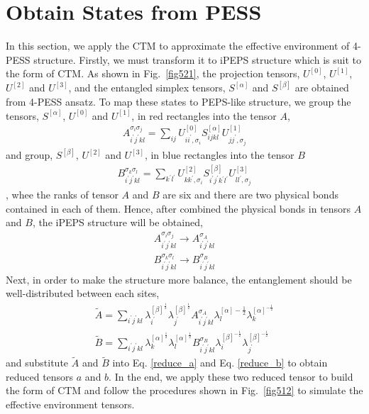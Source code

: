 \section{Obtain States from PESS}
\label{pessctm}
In this section, we apply the CTM to approximate the effective environment of 4-PESS structure. Firstly, we must transform it to iPEPS structure which is suit to the form of CTM. As shown in Fig.~\ref{fig521}, the projection tensors, $U^{[0]}$, $U^{[1]}$, $U^{[2]}$ and $U^{[3]}$, and the entangled simplex tensors, $S^{[\alpha]}$ and $S^{[\beta]}$ are obtained from 4-PESS ansatz. To map these states to PEPS-like structure, we group the tensors, $S^{[\alpha]}$, $U^{[0]}$ and $U^{[1]}$, in red rectangles into the tensor $A$, 
\begin{align}
	A^{\sigma_i \sigma_j}_{i^{\prime}j^{\prime}kl} = \sum_{ij}{U^{[0]}_{ ii^{\prime},\sigma_i} S^{[\alpha]}_{ijkl} U^{[1]}_{ jj^{\prime},\sigma_j}}
\end{align}
and group, $S^{[\beta]}$, $U^{[2]}$ and $U^{[3]}$, in blue rectangles into the tensor $B$
\begin{align}
	B^{\sigma_k \sigma_l}_{i^{\prime}j^{\prime}kl} = \sum_{k^{\prime}l^{\prime}}{U^{[2]}_{ kk^{\prime},\sigma_i} S^{[\beta]}_{i^{\prime}j^{\prime}k^{\prime}l^{\prime}} U^{[3]}_{ ll^{\prime},\sigma_j}}
\end{align}
, whee the ranks of tensor $A$ and $B$ are six and there are two physical bonds contained in each of them. Hence, after combined the physical bonds in tensors $A$ and $B$, the iPEPS structure will be obtained,
\begin{align}
	A^{\sigma_i \sigma_j}_{i^{\prime}j^{\prime}kl} \rightarrow  A^{\sigma_A}_{i^{\prime}j^{\prime}kl} \\
	B^{\sigma_k \sigma_l}_{i^{\prime}j^{\prime}kl} \rightarrow  B^{\sigma_B}_{i^{\prime}j^{\prime}kl}
\end{align}
Next, in order to make the structure more balance, the entanglement should be well-distributed between each sites, 
\begin{align}
	\widetilde{A} = \sum_{i^{\prime}j^{\prime}kl}{\lambda^{[\beta]^{\frac{1}{2}}}_{i^{\prime}} \lambda^{[\beta]^{\frac{1}{2}}}_{j^{\prime}} A^{\sigma_A}_{i^{\prime}j^{\prime}kl}\lambda^{[\alpha]-\frac{1}{2}}_{l} \lambda^{[\alpha]^{-\frac{1}{2}}}_{k}}\\
	\widetilde{B} = \sum_{i^{\prime}j^{\prime}kl}{\lambda^{[\alpha]^{\frac{1}{2}}}_{k} \lambda^{[\alpha]^{\frac{1}{2}}}_{l} B^{\sigma_B}_{i^{\prime}j^{\prime}kl} \lambda^{[\beta]^{-\frac{1}{2}}}_{i} \lambda^{[\beta]^{-\frac{1}{2}}}_{j^{\prime}}}
\end{align}
and substitute $\widetilde{A}$ and $\widetilde{B}$ into Eq. \ref{reduce_a} and Eq. \ref{reduce_b} to obtain reduced tensors $a$ and $b$. In the end, we apply these two reduced tensor to build the form of CTM and follow the procedures shown in Fig.~\ref{fig512} to simulate the effective environment tensors.

